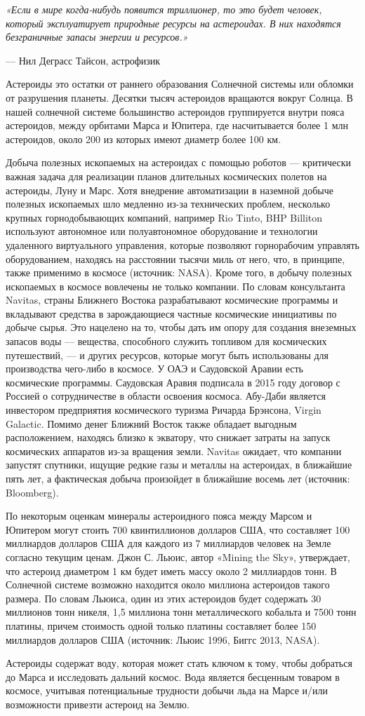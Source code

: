 \textit{«Если в мире когда-нибудь появится триллионер, то это будет человек, который эксплуатирует природные ресурсы на астероидах. В них находятся безграничные запасы энергии и ресурсов.» }

— Нил Деграсс Тайсон, астрофизик

Астероиды это остатки от раннего образования Солнечной системы или обломки от разрушения планеты. Десятки тысяч астероидов вращаются вокруг Солнца. В нашей солнечной системе большинство астероидов группируется внутри пояса астероидов, между орбитами Марса и Юпитера, где насчитывается более 1 млн астероидов, около 200 из которых имеют диаметр более 100 км.

Добыча полезных ископаемых на астероидах с помощью роботов — критически важная задача для реализации планов длительных космических полетов на астероиды, Луну и Марс. Хотя внедрение автоматизации в наземной добыче полезных ископаемых шло медленно из-за технических проблем, несколько крупных горнодобывающих компаний, например Rio Tinto, BHP Billiton используют автономное или полуавтономное оборудование и технологии удаленного виртуального управления, которые позволяют горнорабочим управлять оборудованием, находясь на расстоянии тысячи миль от него, что, в принципе, также применимо в космосе (источник: NASA). Кроме того, в добычу полезных ископаемых в космосе вовлечены не только компании. По словам консультанта Navitas, страны Ближнего Востока разрабатывают космические программы и вкладывают средства в зарождающиеся частные космические инициативы по добыче сырья. Это нацелено на то, чтобы дать им опору для создания внеземных запасов воды — вещества, способного служить топливом для космических путешествий, — и других ресурсов, которые могут быть использованы для производства чего-либо в космосе. У ОАЭ и Саудовской Аравии есть космические программы. Саудовская Аравия подписала в 2015 году договор с Россией о сотрудничестве в области освоения космоса. Абу-Даби является инвестором предприятия космического туризма Ричарда Брэнсона, Virgin Galactic. Помимо денег Ближний Восток также обладает выгодным расположением, находясь близко к экватору, что снижает затраты на запуск космических аппаратов из-за вращения земли. Navitas ожидает, что компании запустят спутники, ищущие редкие газы и металлы на астероидах, в ближайшие пять лет, а фактическая добыча произойдет в ближайшие восемь лет (источник: Bloomberg).

По некоторым оценкам минералы астероидного пояса между Марсом и Юпитером могут стоить 700 квинтиллионов долларов США, что составляет 100 миллиардов долларов США для каждого из 7 миллиардов человек на Земле согласно текущим ценам. Джон С. Льюис, автор «Mining the Sky», утверждает, что астероид диаметром 1 км будет иметь массу около 2 миллиардов тонн. В Солнечной системе возможно находится около миллиона астероидов такого размера. По словам Льюиса, один из этих астероидов будет содержать 30 миллионов тонн никеля, 1,5 миллиона тонн металлического кобальта и 7500 тонн платины, причем стоимость одной только платины составляет более 150 миллиардов долларов США (источник: Льюис 1996, Биггс 2013, NASA).

Астероиды содержат воду, которая может стать ключом к тому, чтобы добраться до Марса и исследовать дальний космос. Вода является бесценным товаром в космосе, учитывая потенциальные трудности добычи льда на Марсе и/или возможности привезти астероид на Землю.
